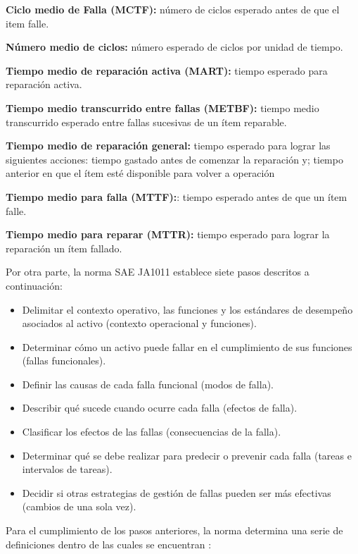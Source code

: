 \begin{description}
\item \textbf{Ciclo medio de Falla (MCTF):} número de ciclos esperado antes de que el item falle.
\item \textbf{Número medio de ciclos:} número esperado de ciclos por unidad de tiempo.
\item \textbf{Tiempo medio de reparación activa (MART):} tiempo esperado para reparación activa.
\item \textbf{Tiempo medio transcurrido entre fallas (METBF):} tiempo medio transcurrido esperado entre fallas sucesivas de un ítem reparable.
\item \textbf{Tiempo medio de reparación general:} tiempo esperado para lograr las siguientes acciones: tiempo gastado antes de comenzar la reparación y; tiempo anterior en que el ítem esté disponible para volver a operación
\item \textbf{Tiempo medio para falla (MTTF):}: tiempo esperado antes de que un ítem falle.
\item \textbf{Tiempo medio para reparar (MTTR):} tiempo esperado para lograr la reparación un ítem fallado.
\end{description}

Por otra parte, la norma SAE JA1011 establece siete pasos descritos a continuación:\\

\begin{itemize}
\item Delimitar el contexto operativo, las funciones y los estándares de desempeño asociados al activo (contexto operacional y funciones).
\item Determinar cómo un activo puede fallar en el cumplimiento de sus funciones (fallas funcionales).
\item Definir las causas de cada falla funcional (modos de falla).
\item Describir qué sucede cuando ocurre cada falla (efectos de falla).
\item Clasificar los efectos de las fallas (consecuencias de la falla).
\item Determinar qué se debe realizar para predecir o prevenir cada falla (tareas e intervalos de tareas).
\item Decidir si otras estrategias de gestión de fallas pueden ser más efectivas (cambios de una sola vez). 
\end{itemize}

Para el cumplimiento de los pasos anteriores, la norma determina una serie de definiciones dentro de las cuales se encuentran \parencite{saeja1011}:\\


